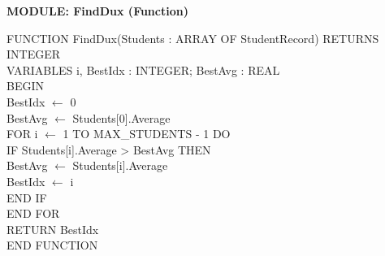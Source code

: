 \documentclass[11pt]{article}
\begin{document}
\begin{exoresolu}
\textbf{MODULE: FindDux (Function)}
\begin{flushleft}
\ttfamily\small
FUNCTION FindDux(Students : ARRAY OF StudentRecord) RETURNS INTEGER\\
VARIABLES i, BestIdx : INTEGER; BestAvg : REAL\\
BEGIN\\
\hspace{1em}BestIdx $\leftarrow$ 0\\
\hspace{1em}BestAvg $\leftarrow$ Students[0].Average\\
\hspace{1em}FOR i $\leftarrow$ 1 TO MAX\_STUDENTS - 1 DO\\
\hspace{2em}IF Students[i].Average > BestAvg THEN\\
\hspace{3em}BestAvg $\leftarrow$ Students[i].Average\\
\hspace{3em}BestIdx $\leftarrow$ i\\
\hspace{2em}END IF\\
\hspace{1em}END FOR\\
\hspace{1em}RETURN BestIdx\\
END FUNCTION
\end{flushleft}


\end{exoresolu}
\end{document}
